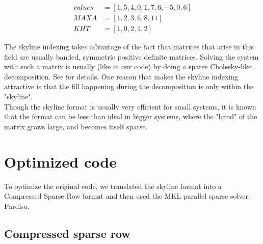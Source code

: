 \documentclass[11pt]{article}
\begin{document}
\begin{align}
values&=[1, 5, 4, 0, 1, 7, 6, -5, 0, 6]\\
MAXA&= [1, 2, 3, 6, 8, 11] \\
KHT&=[1, 0, 2, 1, 2]
\end{align}

 The skyline indexing takes advantage of the fact that matrices that arise in this field are usually banded, symmetric positive definite matrices. Solving the system with such a matrix is usually (like in our code) by doing a sparse Cholesky-like decomposition. See \cite{Bathe} for details. One reason that makes the skyline indexing attractive is that the fill happening during the decomposition is only within the "skyline".\\
 
Though the skyline format is usually very efficient for small systems, it is known that the format can be less than ideal in bigger systems, where the "band" of the matrix grows large, and becomes itself  sparse.

\section{Optimized code}\label{sec:newCode}
To optimize the original code, we translated the skyline format into a Compressed Sparse Row format and then used the MKL parallel sparse solver: Pardiso.

\subsection{Compressed sparse row}
\end{document}

